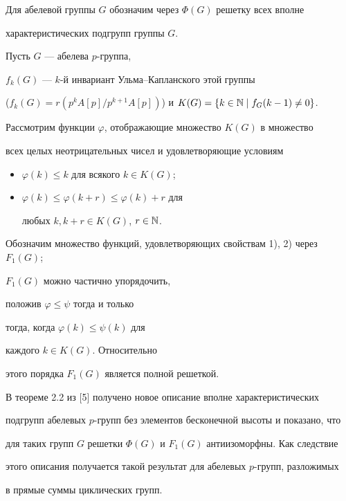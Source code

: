 Для абелевой группы $G$ обозначим через $\Phi(G)$  решетку всех вполне


характеристических подгрупп группы $G$.





Пусть $G$ --- абелева $p$-группа,


$f_k(G)$ --- $k$-й инвариант Ульма--Капланского этой группы


($f_k(G)=r(p^kA[p]/p^{k+1}A[p])$) и $K(G)=\{k\in\Bbb N\mid f_G(k-1)\ne 0\}$.


Рассмотрим функции $\varphi$, отображающие множество $K(G)$ в множество


всех целых неотрицательных чисел и удовлетворяющие условиям


\begin{itemize}


\item[1)] $\varphi(k)\leqslant k$ для всякого $k\in K(G)$;


\item[2)] $\varphi(k)\leqslant\varphi(k+r)\leqslant\varphi(k)+r$ для


любых $k,k+r\in K(G)$, $r\in\Bbb N$.


\end{itemize}





Обозначим множество функций, удовлетворяющих свойствам 1), 2) через $F_1(G)$;


$F_1(G)$ можно частично упорядочить,


положив $\varphi\leqslant\psi$ тогда и только


тогда, когда $\varphi(k)\leqslant\psi(k)$ для


каждого $k\in K(G)$. Относительно


этого порядка $F_1(G)$ является полной решеткой.





В теореме 2.2 из [5] получено новое описание вполне характеристических


подгрупп абелевых $p$-групп без элементов бесконечной высоты и показано, что


для таких групп $G$ решетки $\Phi(G)$ и $F_1(G)$ антиизоморфны. Как следствие


этого описания получается такой результат для абелевых $p$-групп, разложимых


в прямые суммы циклических групп.





